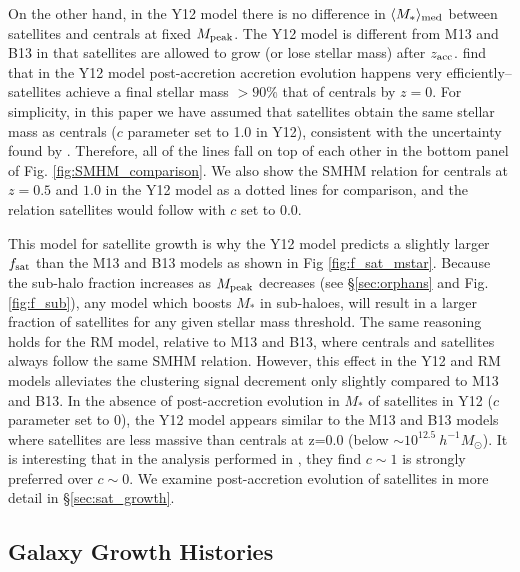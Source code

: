 \documentclass[a4paper,fleqn,usenatbib]{mnras}
\begin{document}
On the other hand, in the Y12 model there is no difference in $\langle M_*\rangle_{\rm med}$ between satellites and centrals at fixed $M_{\rm peak}$.  The Y12 model is different from M13 and B13 in that satellites are allowed to grow (or lose stellar mass) after $z_{\rm acc}$.  \citet{Yang:2012ew} find that in the Y12 model post-accretion accretion evolution happens very efficiently--satellites achieve a final stellar mass $> 90\%$ that of centrals by $z=0$.  For simplicity, in this paper we have assumed that satellites obtain the same stellar mass as centrals ($c$ parameter set to 1.0 in Y12), consistent with the uncertainty found by \citet{Yang:2012ew}.  Therefore, all of the lines fall on top of each other in the bottom panel of Fig. \ref{fig:SMHM_comparison}.  We also show the SMHM relation for centrals at $z=0.5$ and $1.0$ in the Y12 model as a dotted lines for comparison, and the relation satellites would follow with $c$ set to $0.0$.

This model for satellite growth is why the Y12 model predicts a slightly larger $f_{\rm sat}$ than the M13 and B13 models as shown in Fig \ref{fig:f_sat_mstar}.  Because the sub-halo fraction increases as $M_{\rm peak}$ decreases (see \S \ref{sec:orphans} and Fig. \ref{fig:f_sub}), any model which boosts $M_*$ in sub-haloes, will result in a larger fraction of satellites for any given stellar mass threshold.  The same reasoning holds for the RM model, relative to M13 and B13, where centrals and satellites always follow the same SMHM relation.  However, this effect in the Y12 and RM models alleviates the clustering signal decrement only slightly compared to M13 and B13.  In the absence of post-accretion evolution in $M_*$ of satellites in Y12 ($c$ parameter set to 0), the Y12 model appears similar to the M13 and B13 models where satellites are less massive than centrals at z=0.0 (below $\sim 10^{12.5} ~ h^{-1} M_{\odot}$).  It is interesting that in the analysis performed in \citet[][]{Yang:2012ew}, they find $c \sim 1$ is strongly preferred over $c \sim 0$.  We examine post-accretion evolution of satellites in more detail in \S \ref{sec:sat_growth}.


\subsection{Galaxy Growth Histories}
\end{document}
